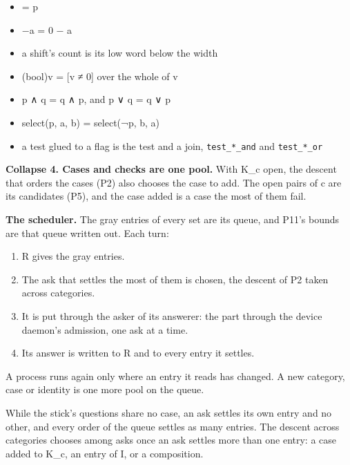 \begin{itemize}
\item [select(p, 1, 0) ≠ 0] = p
\item −a = 0 − a
\item a shift's count is its low word below the width
\item (bool)v = [v ≠ 0] over the whole of v
\item p ∧ q = q ∧ p, and p ∨ q = q ∨ p
\item select(p, a, b) = select(¬p, b, a)
\item a test glued to a flag is the test and a join, \texttt{test\_\allowbreak{}*\_\allowbreak{}and} and \texttt{test\_\allowbreak{}*\_\allowbreak{}or}
\end{itemize}

\textbf{Collapse 4. Cases and checks are one pool.} With K\_\allowbreak{}c open, the descent that orders the cases (P2) also chooses the case to add. The open pairs of c are its candidates (P5), and the case added is a case the most of them fail.

\textbf{The scheduler.} The gray entries of every set are its queue, and P11's bounds are that queue written out. Each turn:

\begin{enumerate}
\item R gives the gray entries.
\item The ask that settles the most of them is chosen, the descent of P2 taken across categories.
\item It is put through the asker of its answerer: the part through the device daemon's admission, one ask at a time.
\item Its answer is written to R and to every entry it settles.
\end{enumerate}

A process runs again only where an entry it reads has changed. A new category, case or identity is one more pool on the queue.

While the stick's questions share no case, an ask settles its own entry and no other, and every order of the queue settles as many entries. The descent across categories chooses among asks once an ask settles more than one entry: a case added to K\_\allowbreak{}c, an entry of I, or a composition.


